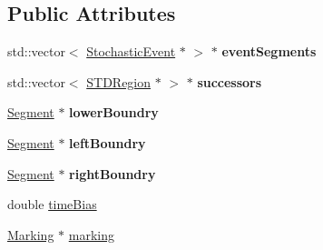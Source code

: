 \subsection*{Public Attributes}
\begin{DoxyCompactItemize}
\item 
\hypertarget{classSTDRegion_ad665c33c075285e3f6c44db0fc2b2408}{std\-::vector$<$ \hyperlink{structStochasticEvent}{Stochastic\-Event} $\ast$ $>$ $\ast$ {\bfseries event\-Segments}}\label{classSTDRegion_ad665c33c075285e3f6c44db0fc2b2408}

\item 
\hypertarget{classSTDRegion_ad30192b606376da2a13c8a6d44d38a62}{std\-::vector$<$ \hyperlink{classSTDRegion}{S\-T\-D\-Region} $\ast$ $>$ $\ast$ {\bfseries successors}}\label{classSTDRegion_ad30192b606376da2a13c8a6d44d38a62}

\item 
\hypertarget{classSTDRegion_a5699bcbca000b47f0f35d1d2a954482d}{\hyperlink{classSegment}{Segment} $\ast$ {\bfseries lower\-Boundry}}\label{classSTDRegion_a5699bcbca000b47f0f35d1d2a954482d}

\item 
\hypertarget{classSTDRegion_a69d0da9f23e4dd8f79b2cb3ba40e6283}{\hyperlink{classSegment}{Segment} $\ast$ {\bfseries left\-Boundry}}\label{classSTDRegion_a69d0da9f23e4dd8f79b2cb3ba40e6283}

\item 
\hypertarget{classSTDRegion_a10de10f63d9fbd07fe057cd71d91d3c0}{\hyperlink{classSegment}{Segment} $\ast$ {\bfseries right\-Boundry}}\label{classSTDRegion_a10de10f63d9fbd07fe057cd71d91d3c0}

\item 
double \hyperlink{classSTDRegion_a66f6dbac4fc0f9f2b08ac7929ef41295}{time\-Bias}
\item 
\hyperlink{structMarking}{Marking} $\ast$ \hyperlink{classSTDRegion_ad5384bd954f03e3bafaf5bb913ca0485}{marking}
\end{DoxyCompactItemize}


